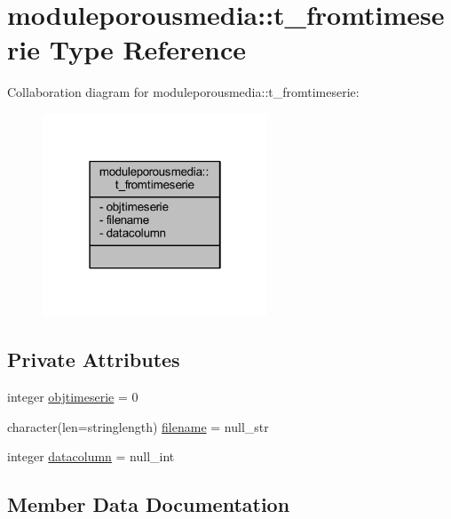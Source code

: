 \hypertarget{structmoduleporousmedia_1_1t__fromtimeserie}{}\section{moduleporousmedia\+:\+:t\+\_\+fromtimeserie Type Reference}
\label{structmoduleporousmedia_1_1t__fromtimeserie}


Collaboration diagram for moduleporousmedia\+:\+:t\+\_\+fromtimeserie\+:\nopagebreak
\begin{figure}[H]
\begin{center}
\leavevmode
\includegraphics[width=190pt]{structmoduleporousmedia_1_1t__fromtimeserie__coll__graph}
\end{center}
\end{figure}
\subsection*{Private Attributes}
\begin{DoxyCompactItemize}
\item 
integer \mbox{\hyperlink{structmoduleporousmedia_1_1t__fromtimeserie_a1f61da628f36433b2e7abf95817fbde7}{objtimeserie}} = 0
\item 
character(len=stringlength) \mbox{\hyperlink{structmoduleporousmedia_1_1t__fromtimeserie_a3627876b473fe4953ddbb656d275e828}{filename}} = null\+\_\+str
\item 
integer \mbox{\hyperlink{structmoduleporousmedia_1_1t__fromtimeserie_a656ef5ce8c4248bbe9f00301efa9540a}{datacolumn}} = null\+\_\+int
\end{DoxyCompactItemize}


\subsection{Member Data Documentation}
\mbox{\label{structmoduleporousmedia_1_1t__fromtimeserie_a656ef5ce8c4248bbe9f00301efa9540a}} 
